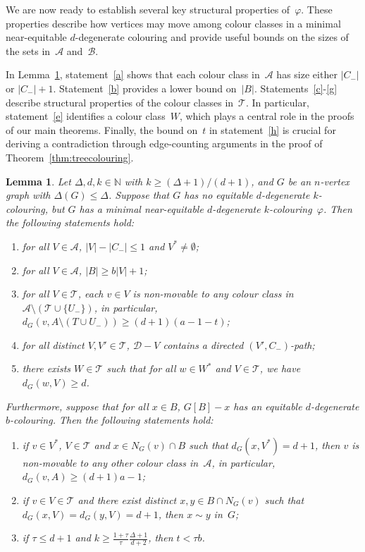 \documentclass[11pt]{article}
\theoremstyle{plain}
\newtheorem{lem}[thm]{Lemma}
\numberwithin{equation}{section}
\begin{document}
We are now ready to establish several key structural properties of~$\varphi$. These properties describe how vertices may move among colour classes in a minimal near-equitable $d$-degenerate colouring and provide useful bounds on the sizes of the sets in~$\mathcal{A}$ and~$\mathcal{B}$.

In Lemma~\ref{lemma:common-properties}, statement~\ref{a} shows that each colour class in~$\mathcal{A}$ has size either $|C_-|$ or $|C_-|+1$. Statement~\ref{b} provides a lower bound on~$|B|$. Statements~\ref{c}-\ref{g} describe structural properties of the colour classes in~$\mathcal{T}$. In particular, statement~\ref{e} identifies a colour class~$W$, which plays a central role in the proofs of our main theorems. Finally, the bound on~$t$ in statement~\ref{h} is crucial for deriving a contradiction through edge-counting arguments in the proof of Theorem~\ref{thm:treecolouring}.
	
	\begin{lem}\label{lemma:common-properties}
	Let $\Delta, d,k \in \mathbb{N}$ with $k \ge (\Delta+1)/(d+1)$, and $G$ be an $n$-vertex graph with $\Delta(G)\leq\Delta$.
		Suppose that $G$ has no equitable $d$-degenerate $k$-colouring, but $G$ has a minimal near-equitable $d$-degenerate $k$-colouring~$\varphi$.
	Then the following statements hold:
\begin{enumerate}[label={\rm (\alph*)},start=1]
\item  for all $V\in \mathcal{A}$,  $|V|-|C_-| \le 1$ and $V^*\neq \emptyset$; \label{a}
\item  for all $V\in \mathcal{A}$, $|B| \ge b |V|+1$;
 \label{b}		
\item for all $V\in \mathcal{T}$, each $v \in V$ is non-movable to any colour class in $\mathcal{A}\setminus ( \mathcal{T}\cup \{U_-\})$, in particular, $d_G(v,A \setminus (T \cup U_-)) \ge (d+1)(a-1-t)$; \label{c}
\item for all distinct $V,V'\in \mathcal{T}$, $\mathcal{D}-V$ contains a directed $(V',C_-)$-path; \label{d}
\item there exists $W\in \mathcal{T}$ such that for all $w\in W^{*}$ and $V\in \mathcal{T}$, we have $d_G(w,V) \ge d$.\label{e}	
\end{enumerate}			
Furthermore,  suppose that for all $x \in B$, $G[B]-x$ has an equitable $d$-degenerate $b$-colouring.
Then the following statements hold:	
\begin{enumerate}	[label={\rm (\alph*)},start=6]		
\item
if $v \in V^*$, $V  \in \mathcal{T}$ and $x \in N_G(v) \cap B$ such that $d_G(x,V^*) =d+1$, then $v$ is non-movable to any other colour class in~$\mathcal{A}$, in particular, $d_G(v,A) \ge (d+1)a-1$;
	  \label{f}
\item   if $ v \in V \in \mathcal{T}$ and there exist distinct $x,y \in B\cap N_{G}(v)$ such that
$d_G(x,V)  = d_G(y,V) =d+1$, then $x \sim y$ in~$G$; \label{g}		
\item   if $\tau \le d+1$ and $ k \ge \frac{1+\tau}{\tau} \frac{\Delta+1}{d+2}$, then $t < \tau b$. \label{h}
\end{enumerate}
\end{lem}
	
\end{document}
